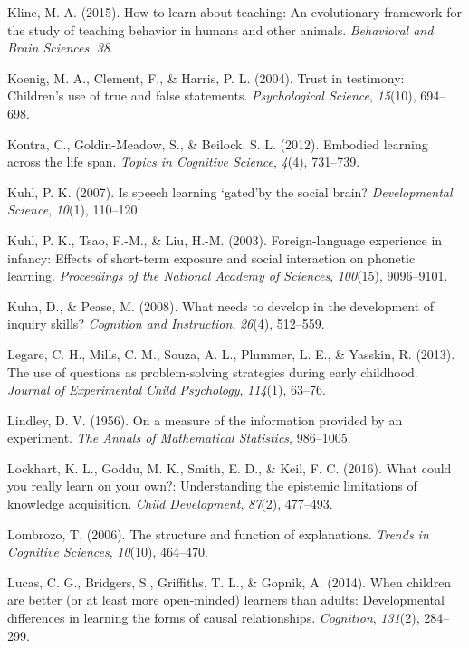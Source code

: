 \documentclass[english,floatsintext,man]{apa6}
\theoremstyle{definition}
\theoremstyle{definition}
\theoremstyle{definition}
\theoremstyle{remark}
\begin{document}
\hypertarget{ref-kline2015learn}{}
Kline, M. A. (2015). How to learn about teaching: An evolutionary
framework for the study of teaching behavior in humans and other
animals. \emph{Behavioral and Brain Sciences}, \emph{38}.

\hypertarget{ref-koenig2004trust}{}
Koenig, M. A., Clement, F., \& Harris, P. L. (2004). Trust in testimony:
Children's use of true and false statements. \emph{Psychological
Science}, \emph{15}(10), 694--698.

\hypertarget{ref-kontra2012embodied}{}
Kontra, C., Goldin-Meadow, S., \& Beilock, S. L. (2012). Embodied
learning across the life span. \emph{Topics in Cognitive Science},
\emph{4}(4), 731--739.

\hypertarget{ref-kuhl2007speech}{}
Kuhl, P. K. (2007). Is speech learning `gated'by the social brain?
\emph{Developmental Science}, \emph{10}(1), 110--120.

\hypertarget{ref-kuhl2003foreign}{}
Kuhl, P. K., Tsao, F.-M., \& Liu, H.-M. (2003). Foreign-language
experience in infancy: Effects of short-term exposure and social
interaction on phonetic learning. \emph{Proceedings of the National
Academy of Sciences}, \emph{100}(15), 9096--9101.

\hypertarget{ref-kuhn2008needs}{}
Kuhn, D., \& Pease, M. (2008). What needs to develop in the development
of inquiry skills? \emph{Cognition and Instruction}, \emph{26}(4),
512--559.

\hypertarget{ref-legare2013use}{}
Legare, C. H., Mills, C. M., Souza, A. L., Plummer, L. E., \& Yasskin,
R. (2013). The use of questions as problem-solving strategies during
early childhood. \emph{Journal of Experimental Child Psychology},
\emph{114}(1), 63--76.

\hypertarget{ref-lindley1956measure}{}
Lindley, D. V. (1956). On a measure of the information provided by an
experiment. \emph{The Annals of Mathematical Statistics}, 986--1005.

\hypertarget{ref-lockhart2016could}{}
Lockhart, K. L., Goddu, M. K., Smith, E. D., \& Keil, F. C. (2016). What
could you really learn on your own?: Understanding the epistemic
limitations of knowledge acquisition. \emph{Child Development},
\emph{87}(2), 477--493.

\hypertarget{ref-lombrozo2006structure}{}
Lombrozo, T. (2006). The structure and function of explanations.
\emph{Trends in Cognitive Sciences}, \emph{10}(10), 464--470.

\hypertarget{ref-lucas2014children}{}
Lucas, C. G., Bridgers, S., Griffiths, T. L., \& Gopnik, A. (2014). When
children are better (or at least more open-minded) learners than adults:
Developmental differences in learning the forms of causal relationships.
\emph{Cognition}, \emph{131}(2), 284--299.
\end{document}
